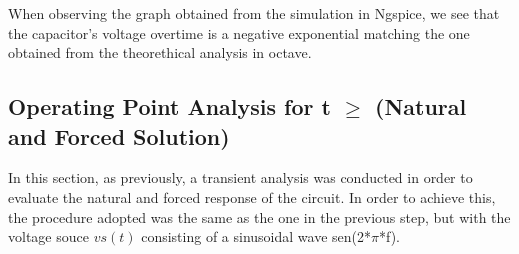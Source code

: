  When observing the graph obtained from the simulation in Ngspice, we see that the capacitor's voltage overtime is a negative exponential matching the one obtained from the theorethical analysis in octave.
 
\subsection{Operating Point Analysis for t $\geq$ (Natural and Forced Solution)}
In this section, as previously, a transient analysis was conducted in order to evaluate the natural and forced response of the circuit. In order to achieve this, the procedure adopted was the same as the one in the previous step, but with the voltage souce $vs(t)$ consisting of a sinusoidal wave sen(2*$\pi$*f).  

\begin{figure}[H] 
\centering


\end{figure}
